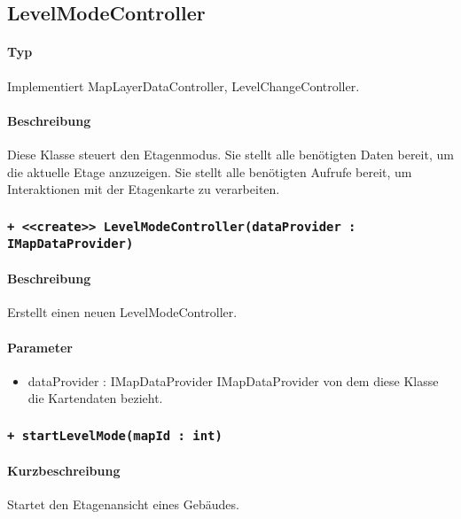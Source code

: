 \subsection{LevelModeController}
\paragraph*{Typ}
Implementiert MapLayerDataController, LevelChangeController.
\paragraph*{Beschreibung}
Diese Klasse steuert den Etagenmodus. Sie stellt alle benötigten Daten bereit, um die aktuelle Etage anzuzeigen. 
Sie stellt alle benötigten Aufrufe bereit, um Interaktionen mit der Etagenkarte zu verarbeiten.

\subsubsection{\texttt{+ <<create>> LevelModeController(dataProvider : IMapDataProvider)}}%
\paragraph*{Beschreibung}
Erstellt einen neuen LevelModeController.
\paragraph*{Parameter}
\begin{itemize}
    \item dataProvider : IMapDataProvider IMapDataProvider von dem diese Klasse die Kartendaten bezieht.
\end{itemize}

\subsubsection{\texttt{+ startLevelMode(mapId : int)}}%
\paragraph*{Kurzbeschreibung}
Startet den Etagenansicht eines Gebäudes.
